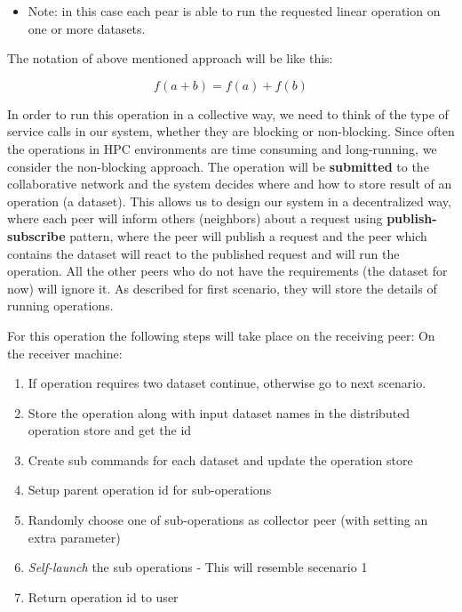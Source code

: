 \begin{itemize}
\item Note: in this case each pear is able to run the requested linear operation on one or more datasets.
\end{itemize}

The notation of above mentioned approach will be like this:

\[ f(a + b) = f(a) + f(b) \]

In order to run this operation in a collective way, 
we need to think of the type of service calls in our system, 
whether they are blocking or non-blocking. 
Since often the operations in HPC environments are time consuming and long-running, 
we consider the non-blocking approach. 
The operation will be \textbf{submitted} to the collaborative network and
the system decides where and how to store result of an operation (a dataset).
This allows us to design our system in a decentralized way, 
where each peer will inform others (neighbors) about a request using \textbf{publish-subscribe} pattern, 
where the peer will publish a request and the peer which contains 
the dataset will react to the published request and will run the operation. 
All the other peers who do not have the requirements (the dataset for now) will ignore it.
As described for first scenario, 
they will store the details of running operations.


For this operation the following steps will take place on the receiving peer:
On the receiver machine:
\begin{enumerate}
\item If operation requires two dataset continue, otherwise go to next scenario.
\item Store the operation along with input dataset names in the distributed operation store and get the id
\item Create sub commands for each dataset and update the operation store
\item Setup parent operation id for sub-operations
\item Randomly choose one of sub-operations as collector peer (with setting an extra parameter)
\item \textit{Self-launch} the sub operations - This will resemble secenario 1
\item Return operation id to user
\end{enumerate}


